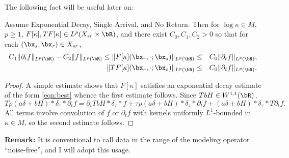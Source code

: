 The following fact will be useful later on:

\begin{prop}
  \label{thm:noisefree}
  Assume Exponential Decay, Single Arrival, and No Return. Then for
  $\log \kappa \in M$, $p \ge 1$, $F[\kappa], TF[\kappa]
  \in L^p(X_{sr} \times \bR)$, and there exist $C_0, C_1, C_2 >0$ so
  that for each $(\bx_s,\bx_r) \in X_{sr}$,
  \begin{eqnarray}
    \label{eqn:dnorms}
    C_1\|\partial_tf\|_{L^p(\bR)} - C_2\|f\|_{L^p(\bR)} \le \|F[\kappa](\bx_r,\cdot;\bx_s)\|_{L^p(\bR)} & \le & C_0\|\partial_tf\|_{L^p(\bR)}, \nonumber \\
    \|TF[\kappa](\bx_r,\cdot;\bx_s)\|_{L^p(\bR)} & \le & C_0\|\partial_tf\|_{L^p(\bR)}.
  \end{eqnarray}
\end{prop}

\begin{proof}
  A simple estimate shows that $F[\kappa]$ satisfies an exponential
  decay estimate of the form \ref{eqn:best} whence the first estimate
  follows. Since $TbH \in W^{1,1}(\bR)$,
  \[
    T\rho(a\delta + bH)*\delta_{\tau}*\partial_t f = \partial_t TbH *
    \delta_{\tau} * f + \tau \rho (a\delta +
    bH)*\delta_{\tau}*\partial_t f  + (a\delta +
    bH)*\delta_{\tau}*T\partial_t f.
  \]
  All terms involve convolution of $f$ or $\partial_t f$ with kernels
  uniformly $L^1$-bounded in $\kappa \in M$, so the second estimate follows. 
\end{proof}

{\bf Remark:} It is conventional to call data in the range of the
modeling operator ``noise-free'', and I will adopt this usage.

